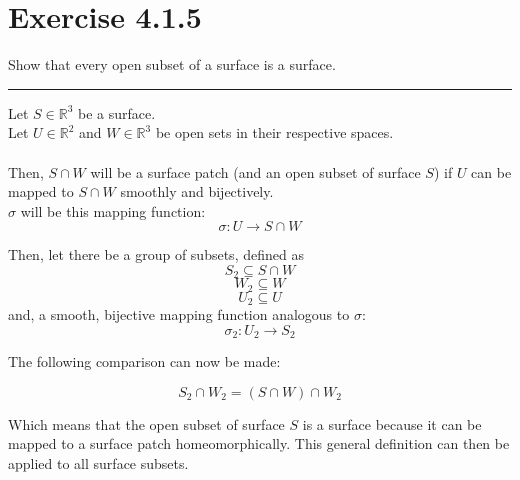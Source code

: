 \documentclass[12pt]{article}
\begin{document}
\maketitle

\section*{Exercise 4.1.5}
Show that every open subset of a surface is a surface.

\vspace{1cm}
\hrule
\vspace{1cm}

Let $S \in \mathbb{R}^3$ be a surface.\\
Let $U \in \mathbb{R}^2$ and $W \in \mathbb{R}^3$ be open sets in their respective spaces.\\
\\
\indent
Then, $S \cap W$ will be a surface patch (and an open subset of surface $S$) if $U$ can be mapped to $S \cap W$ smoothly and bijectively.\\
\indent
$\sigma$ will be this mapping function:
$$
\sigma: U \rightarrow S \cap W
$$

Then, let there be a group of subsets, defined as
$$ S_2 \subseteq S \cap W$$
$$ W_2 \subseteq W$$
$$ U_2 \subseteq U$$
and, a smooth, bijective mapping function analogous to $\sigma$:
$$
\sigma_2: U_2 \rightarrow S_2
$$

The following comparison can now be made:

$$
S_2 \cap W_2 = \left( S \cap W \right) \cap W_2
$$

Which means that the open subset of surface $S$ is a surface because it can be mapped to a surface patch homeomorphically. This general definition can then be applied to all surface subsets.
\end{document}
